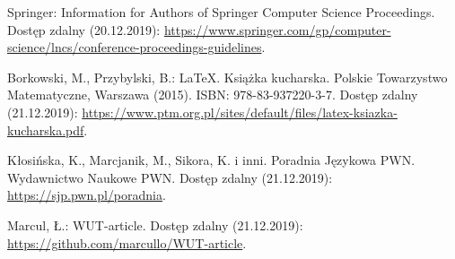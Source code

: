 \begin{thebibliography}{}
Springer: Information for Authors of Springer Computer Science Proceedings. Dostęp zdalny (20.12.2019):
\url{https://www.springer.com/gp/computer-science/lncs/conference-proceedings-guidelines}.

Borkowski, M., Przybylski, B.: \LaTeX. Książka kucharska. Polskie Towarzystwo Matematyczne, Warszawa (2015). ISBN: 978-83-937220-3-7. Dostęp zdalny (21.12.2019):
\url{https://www.ptm.org.pl/sites/default/files/latex-ksiazka-kucharska.pdf}.

Kłosińska, K., Marcjanik, M., Sikora, K. i inni. Poradnia Językowa PWN. Wydawnictwo Naukowe PWN. Dostęp zdalny (21.12.2019):
\url{https://sjp.pwn.pl/poradnia}.

Marcul, Ł.: WUT-article. Dostęp zdalny (21.12.2019):\\
\url{https://github.com/marcullo/WUT-article}.
\end{thebibliography}

